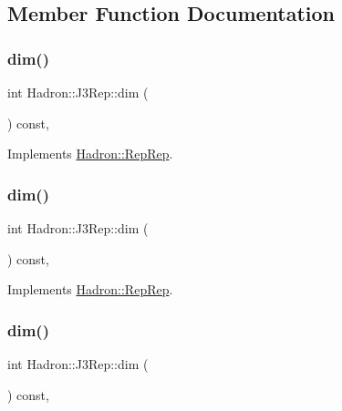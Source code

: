\subsection{Member Function Documentation}
\mbox{\label{structHadron_1_1J3Rep_ab2c01ddb7d42f7ce131a9e07f0a6703d}} 
\subsubsection{\texorpdfstring{dim()}{dim()}\hspace{0.1cm}{\footnotesize\ttfamily [1/5]}}
{\footnotesize\ttfamily int Hadron\+::\+J3\+Rep\+::dim (\begin{DoxyParamCaption}{ }\end{DoxyParamCaption}) const\hspace{0.3cm}{\ttfamily [inline]}, {\ttfamily [virtual]}}



Implements \mbox{\hyperlink{structHadron_1_1RepRep_a92c8802e5ed7afd7da43ccfd5b7cd92b}{Hadron\+::\+Rep\+Rep}}.

\mbox{\label{structHadron_1_1J3Rep_ab2c01ddb7d42f7ce131a9e07f0a6703d}} 
\subsubsection{\texorpdfstring{dim()}{dim()}\hspace{0.1cm}{\footnotesize\ttfamily [2/5]}}
{\footnotesize\ttfamily int Hadron\+::\+J3\+Rep\+::dim (\begin{DoxyParamCaption}{ }\end{DoxyParamCaption}) const\hspace{0.3cm}{\ttfamily [inline]}, {\ttfamily [virtual]}}



Implements \mbox{\hyperlink{structHadron_1_1RepRep_a92c8802e5ed7afd7da43ccfd5b7cd92b}{Hadron\+::\+Rep\+Rep}}.

\mbox{\label{structHadron_1_1J3Rep_ab2c01ddb7d42f7ce131a9e07f0a6703d}} 
\subsubsection{\texorpdfstring{dim()}{dim()}\hspace{0.1cm}{\footnotesize\ttfamily [3/5]}}
{\footnotesize\ttfamily int Hadron\+::\+J3\+Rep\+::dim (\begin{DoxyParamCaption}{ }\end{DoxyParamCaption}) const\hspace{0.3cm}{\ttfamily [inline]}, {\ttfamily [virtual]}}




